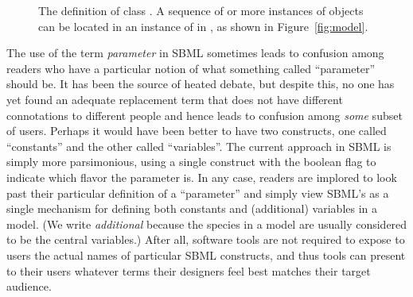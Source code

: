 \begin{figure}[htb]
  \centering
  \small
  \caption{The definition of class \Parameter.  A
      sequence of  or more instances of \Parameter objects can
      be located in an instance of \ListOfParameters in \Model, as
      shown in Figure~\protect\ref{fig:model}.}
  \label{fig:parameter}
\end{figure}

The use of the term \emph{parameter} in SBML sometimes leads to
confusion among readers who have a particular notion of what
something called ``parameter'' should be.  It has been the source
of heated debate, but despite this, no one has yet found an
adequate replacement term that does not have different
connotations to different people and hence leads to confusion
among \emph{some} subset of users.  Perhaps it would have been
better to have two constructs, one called ``constants'' and the
other called ``variables''.  The current approach in SBML is
simply more parsimonious, using a single \Parameter construct with
the boolean flag  to indicate which flavor the
parameter is.  In any case, readers are implored to look past
their particular definition of a ``parameter'' and simply view
SBML's \Parameter as a single mechanism for defining both
constants and (additional) variables in a model.  (We write
\emph{additional} because the species in a model are usually
considered to be the central variables.)  After all, software
tools are not required to expose to users the actual names of
particular SBML constructs, and thus tools can present to their
users whatever terms their designers feel best matches their
target audience.


